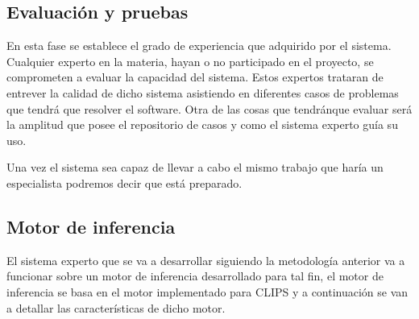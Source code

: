 


\subsection{Evaluación y pruebas}

En esta fase se establece el grado de experiencia que adquirido por el sistema. Cualquier
 experto en la materia, hayan o no participado en el proyecto, se comprometen a evaluar
 la capacidad del sistema. Estos expertos trataran de entrever la calidad de dicho sistema
 asistiendo en diferentes casos de problemas que tendrá que resolver el software. Otra de
 las cosas que tendránque evaluar será la amplitud que posee el repositorio de casos y como
 el sistema experto guía su uso.


Una vez el sistema sea capaz de llevar a cabo el mismo trabajo que haría un especialista
 podremos decir que está preparado.



\subsection{Motor de inferencia}
El sistema experto que se va a desarrollar siguiendo la metodología anterior va
 a funcionar sobre un motor de inferencia desarrollado para tal fin, el motor
 de inferencia se basa en el motor implementado para CLIPS y a continuación se van
 a detallar las características de dicho motor.

